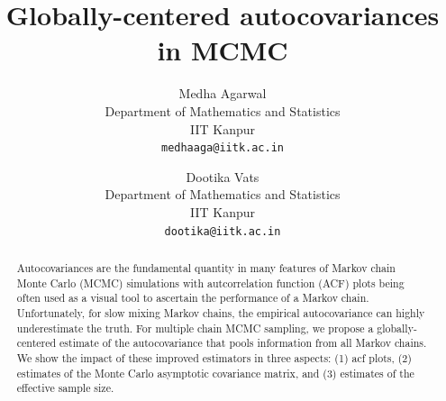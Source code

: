 \documentclass[11pt]{article}
\title{Globally-centered autocovariances in MCMC}
\author{
  Medha Agarwal \\
  Department of Mathematics and Statistics\\
  IIT Kanpur\\
  \texttt{medhaaga@iitk.ac.in} \and
 Dootika Vats \\
  Department of Mathematics and Statistics\\
  IIT Kanpur\\
  \texttt{dootika@iitk.ac.in}
}
\theoremstyle{remark}
\begin{document}
\maketitle


\onehalfspacing
\begin{abstract}
Autocovariances are the fundamental quantity in many features of Markov chain Monte Carlo (MCMC) simulations with autcorrelation function (ACF) plots being often used as a visual tool to ascertain the performance of a Markov chain. Unfortunately, for slow mixing Markov chains, the empirical autocovariance can highly underestimate the truth. For multiple chain MCMC sampling,  we propose a globally-centered estimate of the autocovariance that pools information from all Markov chains. We show the impact of these improved estimators in three aspects: (1) acf plots, (2) estimates of the Monte Carlo asymptotic covariance matrix, and (3) estimates of the effective sample size. 
\end{abstract}







\end{document}
